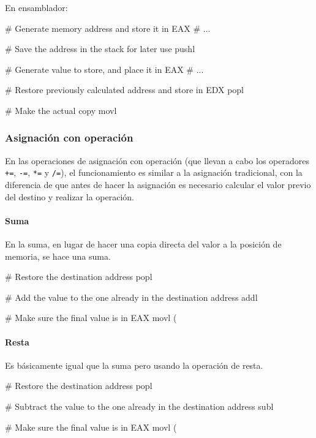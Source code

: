 \documentclass[11pt]{scrartcl}
\begin{document}
En ensamblador:

\begin{gascode}
   # Generate memory address and store it in EAX
   # ...
   
   # Save the address in the stack for later use
   pushl %

   # Generate value to store, and place it in EAX
   # ...

   # Restore previously calculated address and store in EDX
   popl %
   
   # Make the actual copy
   movl %
\end{gascode}

\subsubsection{Asignación con operación}

En las operaciones de asignación con operación (que llevan a cabo los operadores
\texttt{+=}, \texttt{-=}, \texttt{*=} y \texttt{/=}), el funcionamiento es
similar a la asignación tradicional, con la diferencia de que antes de hacer la
asignación es necesario calcular el valor previo del destino y realizar la
operación.

\paragraph{Suma}

En la suma, en lugar de hacer una copia directa del valor a la posición de
memoria, se hace una suma.

\begin{gascode}
    # Restore the destination address
    popl %

    # Add the value to the one already in the destination address
    addl %
    
    # Make sure the final value is in EAX
    movl (%
\end{gascode}

\paragraph{Resta} 

Es básicamente igual que la suma pero usando la operación de resta.

\begin{gascode}
    # Restore the destination address
    popl %

    # Subtract the value to the one already in the destination address
    subl %
    
    # Make sure the final value is in EAX
    movl (%
\end{gascode}
\end{document}
